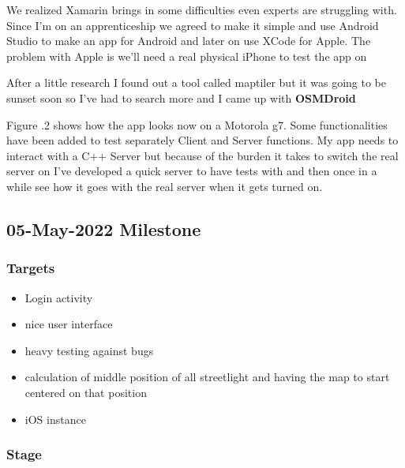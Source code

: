 \documentclass[a4paper,12pt]{article}
\begin{document}
We realized Xamarin brings in some difficulties even experts are struggling with. Since I'm on an apprenticeship we agreed to make it simple and use Android Studio to make an app for Android and later on use XCode for Apple. The problem with Apple is we'll need a real physical iPhone to test the app on

After a little research I found out a tool called maptiler but it was going to be sunset soon so I've had to search more and I came up with \textbf{OSMDroid}

Figure .2 shows how the app looks now on a Motorola g7. Some functionalities have been added to test separately Client and Server functions. My app needs to interact with a C++ Server but because of the burden it takes to switch the real server on I've developed a quick server to have tests with and then once in a while see how it goes with the real server when it gets turned on.




\subsection{05-May-2022 Milestone}

\subsubsection{Targets}

\begin{itemize}
\item{Login activity}
\item{nice user interface}
\item{heavy testing against bugs}
\item{calculation of middle position of all streetlight and having the map to start centered on that position}
\item{iOS instance}
\end{itemize}

\clearpage

\subsubsection{Stage}
\end{document}
